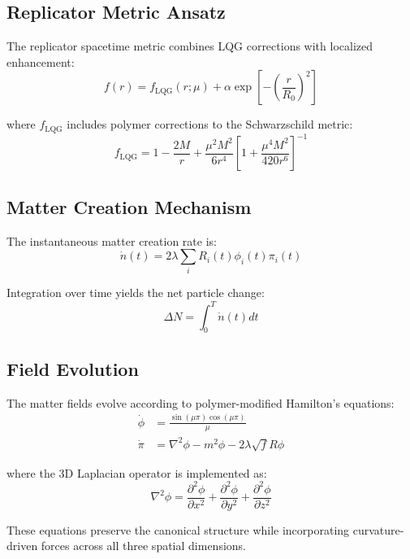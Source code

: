 \documentclass[11pt]{article}
\begin{document}
\subsection{Replicator Metric Ansatz}

The replicator spacetime metric combines LQG corrections with localized enhancement:
\begin{equation}
f(r) = f_{\text{LQG}}(r;\mu) + \alpha \exp\left[-\left(\frac{r}{R_0}\right)^2\right]
\end{equation}

where $f_{\text{LQG}}$ includes polymer corrections to the Schwarzschild metric:
\begin{equation}
f_{\text{LQG}} = 1 - \frac{2M}{r} + \frac{\mu^2 M^2}{6r^4}\left[1 + \frac{\mu^4 M^2}{420r^6}\right]^{-1}
\end{equation}

\subsection{Matter Creation Mechanism}

The instantaneous matter creation rate is:
\begin{equation}
\dot{n}(t) = 2\lambda \sum_i R_i(t) \phi_i(t) \pi_i(t)
\end{equation}

Integration over time yields the net particle change:
\begin{equation}
\Delta N = \int_0^T \dot{n}(t) dt
\end{equation}

\subsection{Field Evolution}

The matter fields evolve according to polymer-modified Hamilton's equations:
\begin{align}
\dot{\phi} &= \frac{\sin(\mu\pi)\cos(\mu\pi)}{\mu} \\
\dot{\pi} &= \nabla^2\phi - m^2\phi - 2\lambda\sqrt{f}R\phi
\end{align}

where the 3D Laplacian operator is implemented as:
\begin{equation}
\nabla^2\phi = \frac{\partial^2\phi}{\partial x^2} + \frac{\partial^2\phi}{\partial y^2} + \frac{\partial^2\phi}{\partial z^2}
\end{equation}

These equations preserve the canonical structure while incorporating curvature-driven forces across all three spatial dimensions.
\end{document}
